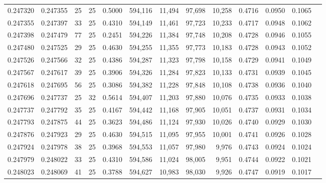 \begin{tabular}{rrrrrrrrrrrrr}
0.247320 & 0.247355 &    25 &  25 &                                     0.5000 & 594,116 &  11,494 &  97,698 &  10,258 & 0.4716 & 0.0950 & 0.1065 \\
0.247355 & 0.247397 &    33 &  25 &                                     0.4310 & 594,149 &  11,461 &  97,723 &  10,233 & 0.4717 & 0.0948 & 0.1062 \\
0.247398 & 0.247479 &    77 &  25 &                                     0.2451 & 594,226 &  11,384 &  97,748 &  10,208 & 0.4728 & 0.0946 & 0.1055 \\
0.247480 & 0.247525 &    29 &  25 &                                     0.4630 & 594,255 &  11,355 &  97,773 &  10,183 & 0.4728 & 0.0943 & 0.1052 \\
0.247526 & 0.247566 &    32 &  25 &                                     0.4386 & 594,287 &  11,323 &  97,798 &  10,158 & 0.4729 & 0.0941 & 0.1049 \\
0.247567 & 0.247617 &    39 &  25 &                                     0.3906 & 594,326 &  11,284 &  97,823 &  10,133 & 0.4731 & 0.0939 & 0.1045 \\
0.247618 & 0.247695 &    56 &  25 &                                     0.3086 & 594,382 &  11,228 &  97,848 &  10,108 & 0.4738 & 0.0936 & 0.1040 \\
0.247696 & 0.247737 &    25 &  32 &                                     0.5614 & 594,407 &  11,203 &  97,880 &  10,076 & 0.4735 & 0.0933 & 0.1038 \\
0.247737 & 0.247792 &    35 &  25 &                                     0.4167 & 594,442 &  11,168 &  97,905 &  10,051 & 0.4737 & 0.0931 & 0.1034 \\
0.247793 & 0.247875 &    44 &  25 &                                     0.3623 & 594,486 &  11,124 &  97,930 &  10,026 & 0.4740 & 0.0929 & 0.1030 \\
0.247876 & 0.247923 &    29 &  25 &                                     0.4630 & 594,515 &  11,095 &  97,955 &  10,001 & 0.4741 & 0.0926 & 0.1028 \\
0.247924 & 0.247978 &    38 &  25 &                                     0.3968 & 594,553 &  11,057 &  97,980 &   9,976 & 0.4743 & 0.0924 & 0.1024 \\
0.247979 & 0.248022 &    33 &  25 &                                     0.4310 & 594,586 &  11,024 &  98,005 &   9,951 & 0.4744 & 0.0922 & 0.1021 \\
0.248023 & 0.248069 &    41 &  25 &                                     0.3788 & 594,627 &  10,983 &  98,030 &   9,926 & 0.4747 & 0.0919 & 0.1017 \\

\end{tabular}
